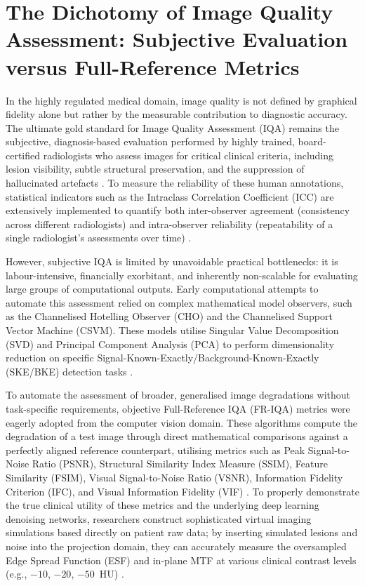 \section{The Dichotomy of Image Quality Assessment: Subjective Evaluation versus Full-Reference Metrics}
\label{sec:lit_iqa_dichotomy}

In the highly regulated medical domain, image quality is not defined by graphical fidelity
alone but rather by the measurable contribution to diagnostic accuracy. The ultimate gold
standard for Image Quality Assessment (IQA) remains the subjective, diagnosis-based
evaluation performed by highly trained, board-certified radiologists who assess images for
critical clinical criteria, including lesion visibility, subtle structural preservation,
and the suppression of hallucinated artefacts \cite{nirupama2025}. To measure the
reliability of these human annotations, statistical indicators such as the Intraclass
Correlation Coefficient (ICC) are extensively implemented to quantify both inter-observer
agreement (consistency across different radiologists) and intra-observer reliability
(repeatability of a single radiologist's assessments over time) \cite{herath2025}.

However, subjective IQA is limited by unavoidable practical bottlenecks: it is
labour-intensive, financially exorbitant, and inherently non-scalable for evaluating
large groups of computational outputs. Early computational attempts to automate this
assessment relied on complex mathematical model observers, such as the Channelised
Hotelling Observer (CHO) and the Channelised Support Vector Machine (CSVM). These models
utilise Singular Value Decomposition (SVD) and Principal Component Analysis (PCA) to
perform dimensionality reduction on specific Signal-Known-Exactly/Background-Known-Exactly
(SKE/BKE) detection tasks \cite{pouget2023channelised}.

To automate the assessment of broader, generalised image degradations without
task-specific requirements, objective Full-Reference IQA (FR-IQA) metrics were eagerly
adopted from the computer vision domain. These algorithms compute the degradation of a
test image through direct mathematical comparisons against a perfectly aligned reference
counterpart, utilising metrics such as Peak Signal-to-Noise Ratio (PSNR), Structural
Similarity Index Measure (SSIM), Feature Similarity (FSIM), Visual Signal-to-Noise Ratio
(VSNR), Information Fidelity Criterion (IFC), and Visual Information Fidelity (VIF)
\cite{yan2018deeplesion}. To properly demonstrate the true clinical utility of these
metrics and the underlying deep learning denoising networks, researchers construct
sophisticated virtual imaging simulations based directly on patient raw data; by inserting
simulated lesions and noise into the projection domain, they can accurately measure the
oversampled Edge Spread Function (ESF) and in-plane MTF at various clinical contrast
levels (e.g., $-10$, $-20$, $-50$~HU) \cite{zhou2024virtual}.

